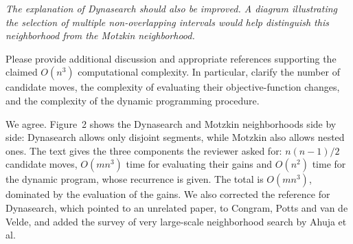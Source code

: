 \documentclass[12pt]{article}
\newenvironment{rc}[1]{\par\medskip\noindent\itshape\renewcommand{\emph}[1]{\textbf{##1}}\ignorespaces}{\par}
\newcommand{\answer}[1]{\par\smallskip\noindent #1\par}
\begin{document}
\begin{rc}{R2 2.4 --- Dynasearch neighborhood: diagram and $O(n^3)$}
The explanation of Dynasearch should also be improved. A diagram illustrating the selection of multiple non-overlapping intervals would help distinguish this neighborhood from the Motzkin neighborhood.

Please provide additional discussion and appropriate references supporting the claimed $O(n^3)$ computational complexity. In particular, clarify the number of candidate moves, the complexity of evaluating their objective-function changes, and the complexity of the dynamic programming procedure.
\end{rc}
\answer{We agree. Figure~2 shows the Dynasearch and Motzkin neighborhoods side by side: Dynasearch allows only disjoint segments, while Motzkin also allows nested ones. The text gives the three components the reviewer asked for: $n(n-1)/2$ candidate moves, $O(mn^3)$ time for evaluating their gains and $O(n^2)$ time for the dynamic program, whose recurrence is given. The total is $O(mn^3)$, dominated by the evaluation of the gains. We also corrected the reference for Dynasearch, which pointed to an unrelated paper, to Congram, Potts and van de Velde, and added the survey of very large-scale neighborhood search by Ahuja et al.}
\end{document}
